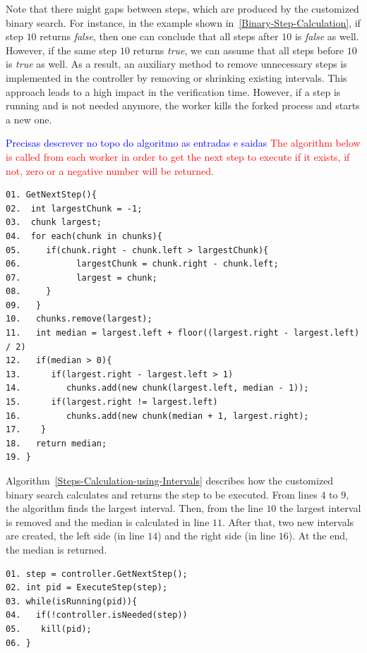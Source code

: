 Note that there might gaps between steps, which are produced by the customized binary search. For instance, in the example shown in~\ref{Binary-Step-Calculation}, if step $10$ returns \textit{false}, then one can conclude that all steps after $10$ is \textit{false} as well. However, if the same step $10$ returns \textit{true}, we can assume that all steps before $10$ is \textit{true} as well. As a result, an auxiliary method to remove unnecessary steps is implemented in the controller by removing or shrinking existing intervals. This approach leads to a high impact in the verification time. However, if a step is running and is not needed anymore, the worker kills the forked process and starts a new one.

\textcolor{blue}{Precisas descrever no topo do algoritmo as entradas e saidas}
\textcolor{red}{The algorithm below is called from each worker in order to get the next step to execute if it exists, if not, zero or a negative number will be returned.}

\begin{lstlisting}[caption=Steps Calculation using Intervals,label=Steps-Calculation-using-Intervals]
01. GetNextStep(){
02.  int largestChunk = -1;
03.  chunk largest;
04.  for each(chunk in chunks){
05.     if(chunk.right - chunk.left > largestChunk){
06.           largestChunk = chunk.right - chunk.left;
07.           largest = chunk;
08.     }
09.   }	
10.   chunks.remove(largest);	
11.   int median = largest.left + floor((largest.right - largest.left) / 2)
12.   if(median > 0){
13.      if(largest.right - largest.left > 1)
14.         chunks.add(new chunk(largest.left, median - 1));	
15.      if(largest.right != largest.left)
16.         chunks.add(new chunk(median + 1, largest.right);
17.    }
18.   return median;
19. }
\end{lstlisting}

Algorithm~\ref{Steps-Calculation-using-Intervals} describes how the customized binary search calculates and returns the step to be executed. From lines $4$ to $9$, the algorithm finds the largest interval. Then, from the line $10$ the largest interval is removed and the median is calculated in line $11$. After that, two new intervals are created, the left side (in line $14$) and the right side (in line $16$). At the end, the median is returned.

\begin{lstlisting}[caption=Worker sample,label=worker-sample]
01. step = controller.GetNextStep();
02. int pid = ExecuteStep(step);
03. while(isRunning(pid)){
04.   if(!controller.isNeeded(step))
05.    kill(pid);
06. }     
\end{lstlisting}


